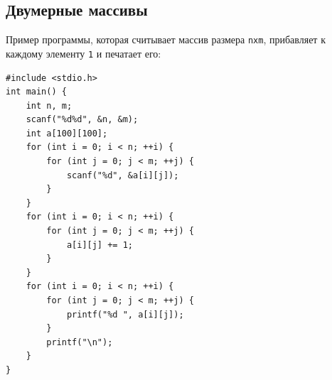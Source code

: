 \documentclass{article}
\begin{document}
\newpage

\subsection*{Двумерные массивы}
Пример программы, которая считывает массив размера \texttt{nxm}, прибавляет к каждому элементу \texttt{1} и печатает его:
\begin{lstlisting}
#include <stdio.h>
int main() {
    int n, m;
    scanf("%d%d", &n, &m);
    int a[100][100];
    for (int i = 0; i < n; ++i) {
        for (int j = 0; j < m; ++j) {
            scanf("%d", &a[i][j]);
        }
    }
    for (int i = 0; i < n; ++i) {
        for (int j = 0; j < m; ++j) {
            a[i][j] += 1;
        }
    }
    for (int i = 0; i < n; ++i) {
        for (int j = 0; j < m; ++j) {
            printf("%d ", a[i][j]);
        }
        printf("\n");
    }
}
\end{lstlisting}
\end{document}
